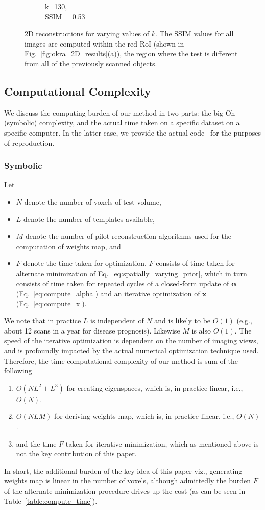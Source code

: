 \documentclass[journal]{IEEEtran}
\begin{document}
\begin{figure}[h]
\begin{subfigure}[b]{0.24\linewidth}
        \caption{k=130,\\ SSIM = 0.53}
     \end{subfigure}
    \caption{2D reconstructions for varying values of $k$. The SSIM values for all images are computed within the red RoI (shown in Fig.~\ref{fig:okra_2D_results}(a)), the region where the test is different from all of the previously scanned objects.}
\label{fig:reconstructions_as_k_varies}
\end{figure}
\subsection{Computational Complexity}

We discuss the computing burden of our method in two parts: the big-Oh
(symbolic) complexity, and the actual time taken on a specific dataset
on a specific computer. In the latter case, we provide the actual
code~\cite{codeRepo} for the purposes of reproduction. 

\subsubsection{Symbolic}
Let
\begin{itemize}
\item $N$ denote the number of voxels of test volume,
\item $L$ denote the number of templates available,
\item $M$ denote the number of pilot reconstruction algorithms used for the computation of weights map, and
\item $F$ denote the time taken for optimization.
  $F$ consists of time taken for alternate minimization of Eq.~\ref{eq:spatially_varying_prior}, which in turn consists of time taken for repeated cycles of a closed-form update of $\boldsymbol{\alpha}$ (Eq.~\ref{eq:compute_alpha}) and an iterative optimization of  $\boldsymbol{x}$ (Eq.~\ref{eq:compute_x}). 
\end{itemize}
We note that in practice $L$ is independent of $N$ and is likely to be
$O(1)$ (e.g., about 12 scans in a year for disease prognosis).
Likewise $M$ is also $O(1)$. The speed of the iterative optimization
is dependent on the number of imaging views, and is profoundly
impacted by the actual numerical optimization technique used.
Therefore, the time computational complexity of our method is sum of
the following
\begin{enumerate}
\item $O(NL^2+L^3)$ for creating eigenspaces, which is, in practice linear, i.e., $O(N)$.
\item $O(NLM)$ for deriving weights map, which is, in practice linear, i.e., $O(N)$.
\item and the time $F$  taken for iterative minimization, which as mentioned above is not the key contribution of this paper. 
\end{enumerate}
In short, the additional burden of the key idea of this paper viz.,
generating weights map is linear in the number of voxels, although
admittedly the burden $F$ of the alternate minimization procedure
drives up the cost (as can be seen in Table~\ref{table:compute_time}).
\end{document}
